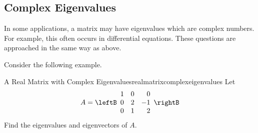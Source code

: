 \subsection{Complex Eigenvalues}

In some applications, a matrix may have eigenvalues
 which are complex numbers. For example, this often occurs in
differential equations. These questions are approached in the same way as above.

Consider the following example.

\begin{example}{A Real Matrix with Complex Eigenvalues}{realmatrixcomplexeigenvalues}
Let 
\begin{equation*}
A=\leftB
\begin{array}{rrr}
1 & 0 &  0 \\
0 & 2 & -1 \\
0 & 1 &  2
\end{array}
\rightB 
\end{equation*}
Find the eigenvalues and eigenvectors of $A$.
\end{example}

